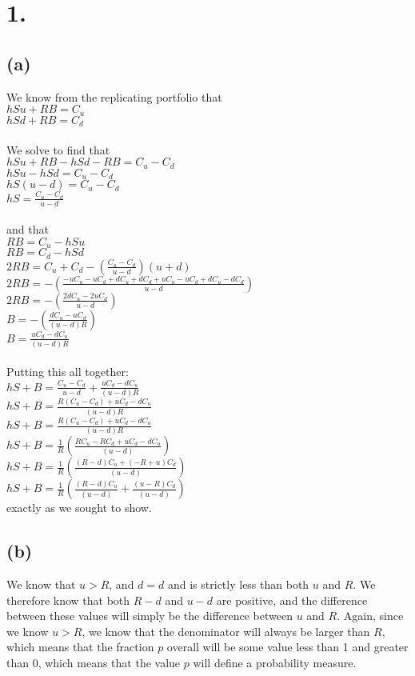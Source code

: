 \documentclass{article}
\begin{document}
\thispagestyle{firstpageheader}

\section*{1.}
{\Large 

\subsection*{(a)}

We know from the replicating portfolio that \\ 
$hSu + RB = C_u$ \\ 
$hSd + RB = C_d$ \\ \\
We solve to find that \\
$hSu + RB - hSd - RB = C_u - C_d$ \\
$hSu - hSd = C_u - C_d$ \\
$hS(u - d) = C_u - C_d$ \\
$hS = \frac{C_u - C_d}{u - d}$ \\ \\
and that \\
$RB = C_u - hSu$ \\
$RB = C_d - hSd$ \\
$2RB = C_u + C_d - (\frac{C_u - C_d}{u - d})(u + d)$ \\ 
$2RB = - (\frac{- uC_u - uC_d + dC_u + dC_d + uC_u - uC_d + dC_u - dC_d}{u - d})$ \\ 
$2RB = - (\frac{2dC_u - 2uC_d}{u - d})$ \\ 
$B = - (\frac{dC_u - uC_d}{(u - d)R})$ \\ 
$B = \frac{uC_d - dC_u}{(u - d)R}$ \\ \\
Putting this all together: \\
$hS + B = \frac{C_u - C_d}{u - d} + \frac{uC_d - dC_u}{(u - d)R}$ \\
$hS + B = \frac{R(C_u - C_d) + uC_d - dC_u}{(u - d)R}$ \\
$hS + B = \frac{R(C_u - C_d) + uC_d - dC_u}{(u - d)R}$ \\
$hS + B = \frac{1}{R}(\frac{RC_u - RC_d + uC_d - dC_u}{(u - d)})$ \\
$hS + B = \frac{1}{R}(\frac{(R-d)C_u + (-R+u)C_d}{(u - d)})$ \\
$hS + B = \frac{1}{R}(\frac{(R-d)C_u}{(u-d)} + \frac{(u-R)C_d}{(u - d)})$ \\
exactly as we sought to show.

\subsection*{(b)}

We know that $u > R$, and $d = d$ and is strictly less than both $u$ and $R$. We therefore know that both $R-d$ and $u-d$ are positive, and the difference between these values will simply be the difference between $u$ and $R$. Again, since we know $u > R$, we know that the denominator will always be larger than $R$, which means that the fraction $p$ overall will be some value less than 1 and greater than 0, which means that the value $p$ will define a probability measure. 

}
\end{document}
